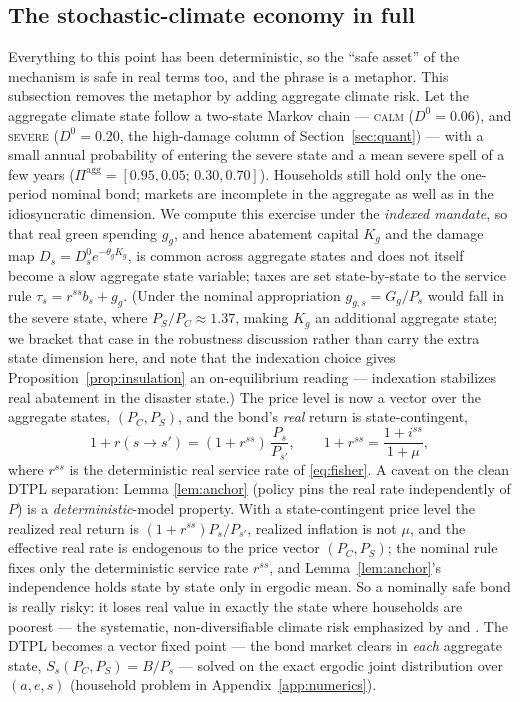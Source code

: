 \documentclass[12pt]{article}
\begin{document}
\subsection{The stochastic-climate economy in full}

Everything to this point has been deterministic, so the ``safe asset''
of the mechanism is safe in real terms too, and the phrase is a
metaphor. This subsection removes the metaphor by adding aggregate climate
risk. Let the aggregate climate state follow a two-state
Markov chain --- \textsc{calm} ($D^0=0.06$), and \textsc{severe}
($D^0=0.20$, the high-damage column of Section~\ref{sec:quant}) --- with
a small annual probability of entering the severe state and a mean severe
spell of a few years ($\Pi^{\mathrm{agg}}=[0.95,0.05;\,0.30,0.70]$).
Households still hold only the one-period nominal bond; markets are
incomplete in the aggregate as well as in the idiosyncratic dimension. We
compute this exercise under the \emph{indexed mandate}, so that real green
spending $g_g$, and hence abatement capital $K_g$ and the damage map
$D_s=D_s^0 e^{-\theta_g K_g}$, is common across aggregate states and does
not itself become a slow aggregate state variable; taxes are set
state-by-state to the service rule $\tau_s=r^{ss}b_s+g_g$. (Under the
nominal appropriation $g_{g,s}=G_g/P_s$ would fall in the severe state,
where $P_S/P_C\approx1.37$, making $K_g$ an additional aggregate state; we
bracket that case in the robustness discussion rather than carry the extra
state dimension here, and note that the indexation choice gives
Proposition~\ref{prop:insulation} an on-equilibrium reading --- indexation
stabilizes real abatement in the disaster state.) The
price level is now a vector over the aggregate states, $(P_C,P_S)$, and
the bond's \emph{real} return is state-contingent,
\[
1 + r(s\to s') = (1+r^{ss})\,\frac{P_s}{P_{s'}},
\qquad 1+r^{ss}=\frac{1+i^{ss}}{1+\mu},
\]
where $r^{ss}$ is the deterministic real service rate of
\eqref{eq:fisher}. A caveat on the clean DTPL separation: Lemma
\ref{lem:anchor} (policy pins the real rate independently of $P$) is a
\emph{deterministic}-model property. With a state-contingent price level the
realized real return is $(1+r^{ss})P_s/P_{s'}$, realized inflation is not
$\mu$, and the effective real rate is endogenous to the price vector
$(P_C,P_S)$; the nominal rule fixes only the deterministic service rate
$r^{ss}$, and Lemma~\ref{lem:anchor}'s independence holds state by state only
in ergodic mean. So a nominally safe bond is really risky: it loses real
value in exactly
the state where households are poorest --- the systematic, non-diversifiable
climate risk emphasized by \citet{barnettbrockhansen2020} and
\citet{cailontzek2019}. The DTPL becomes a vector fixed
point --- the bond market clears in \emph{each} aggregate state,
$S_s(P_C,P_S)=B/P_s$ --- solved on the exact ergodic joint distribution
over $(a,e,s)$ (household problem in Appendix~\ref{app:numerics}).
\end{document}
